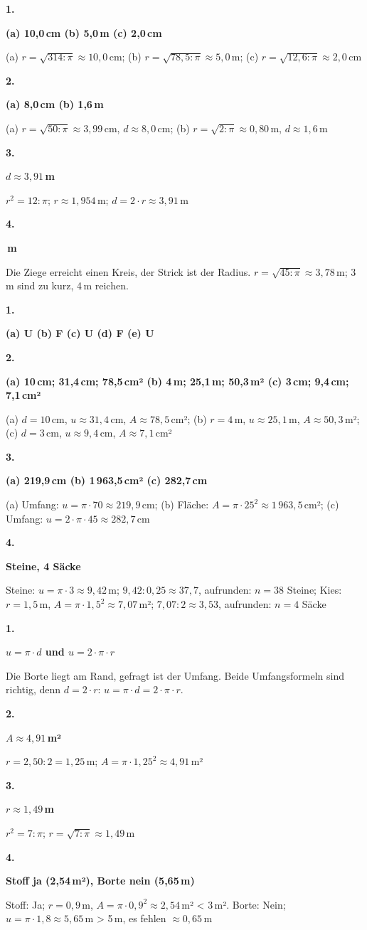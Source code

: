 \documentclass[11pt]{article}
\newcommand{\lsg}[3]{\par\noindent\begin{minipage}[t]{9mm}\textbf{#1}\end{minipage}%
  \begin{minipage}[t]{52mm}\raggedright\bfseries\boldmath #2\end{minipage}\hspace{3mm}%
  \begin{minipage}[t]{\dimexpr\linewidth-64mm\relax}\raggedright\small #3\end{minipage}\par\vspace{4pt}}
\begin{document}
\par\Needspace{25mm}\vspace{6pt}\noindent\colorbox{black!12}{}\hspace{2mm}{\bfseries Radius aus der Fläche}\par\vspace{4pt}
\lsg{1.}{(a) 10,0\,cm (b) 5,0\,m (c) 2,0\,cm}{(a) $r = \sqrt{314 : \pi} \approx 10{,}0$\,cm; (b) $r = \sqrt{78{,}5 : \pi} \approx 5{,}0$\,m; (c) $r = \sqrt{12{,}6 : \pi} \approx 2{,}0$\,cm}
\lsg{2.}{(a) 8,0\,cm (b) 1,6\,m}{(a) $r = \sqrt{50 : \pi} \approx 3{,}99$\,cm, $d \approx 8{,}0$\,cm; (b) $r = \sqrt{2 : \pi} \approx 0{,}80$\,m, $d \approx 1{,}6$\,m}
\lsg{3.}{$d \approx 3{,}91$\,m}{$r^2 = 12 : \pi$; $r \approx 1{,}954$\,m; $d = 2 \cdot r \approx 3{,}91$\,m}
\lsg{4.}{4\,m}{Die Ziege erreicht einen Kreis, der Strick ist der Radius. $r = \sqrt{45 : \pi} \approx 3{,}78$\,m; 3\,m sind zu kurz, 4\,m reichen.}
\par\Needspace{25mm}\vspace{6pt}\noindent\colorbox{black!12}{}\hspace{2mm}{\bfseries Fläche oder Umfang?}\par\vspace{4pt}
\lsg{1.}{(a) U (b) F (c) U (d) F (e) U}{}
\lsg{2.}{(a) 10\,cm; 31,4\,cm; 78,5\,cm² (b) 4\,m; 25,1\,m; 50,3\,m² (c) 3\,cm; 9,4\,cm; 7,1\,cm²}{(a) $d = 10$\,cm, $u \approx 31{,}4$\,cm, $A \approx 78{,}5$\,cm²; (b) $r = 4$\,m, $u \approx 25{,}1$\,m, $A \approx 50{,}3$\,m²; (c) $d = 3$\,cm, $u \approx 9{,}4$\,cm, $A \approx 7{,}1$\,cm²}
\lsg{3.}{(a) 219,9\,cm (b) 1\,963,5\,cm² (c) 282,7\,cm}{(a) Umfang: $u = \pi \cdot 70 \approx 219{,}9$\,cm; (b) Fläche: $A = \pi \cdot 25^2 \approx 1\,963{,}5$\,cm²; (c) Umfang: $u = 2 \cdot \pi \cdot 45 \approx 282{,}7$\,cm}
\lsg{4.}{38 Steine, 4 Säcke}{Steine: $u = \pi \cdot 3 \approx 9{,}42$\,m; $9{,}42 : 0{,}25 \approx 37{,}7$, aufrunden: $n = 38$ Steine; Kies: $r = 1{,}5$\,m, $A = \pi \cdot 1{,}5^2 \approx 7{,}07$\,m²; $7{,}07 : 2 \approx 3{,}53$, aufrunden: $n = 4$ Säcke}
\par\Needspace{25mm}\vspace{6pt}\noindent\colorbox{black!12}{}\hspace{2mm}{\bfseries Probetest}\par\vspace{4pt}
\lsg{1.}{$u = \pi \cdot d$ und $u = 2 \cdot \pi \cdot r$}{Die Borte liegt am Rand, gefragt ist der Umfang. Beide Umfangsformeln sind richtig, denn $d = 2 \cdot r$: $u = \pi \cdot d = 2 \cdot \pi \cdot r$.}
\lsg{2.}{$A \approx 4{,}91$\,m²}{$r = 2{,}50 : 2 = 1{,}25$\,m; $A = \pi \cdot 1{,}25^2 \approx 4{,}91$\,m²}
\lsg{3.}{$r \approx 1{,}49$\,m}{$r^2 = 7 : \pi$; $r = \sqrt{7 : \pi} \approx 1{,}49$\,m}
\lsg{4.}{Stoff ja (2,54\,m²), Borte nein (5,65\,m)}{Stoff: Ja; $r = 0{,}9$\,m, $A = \pi \cdot 0{,}9^2 \approx 2{,}54$\,m² < 3\,m². Borte: Nein; $u = \pi \cdot 1{,}8 \approx 5{,}65$\,m > 5\,m, es fehlen $\approx 0{,}65$\,m}
\end{document}
